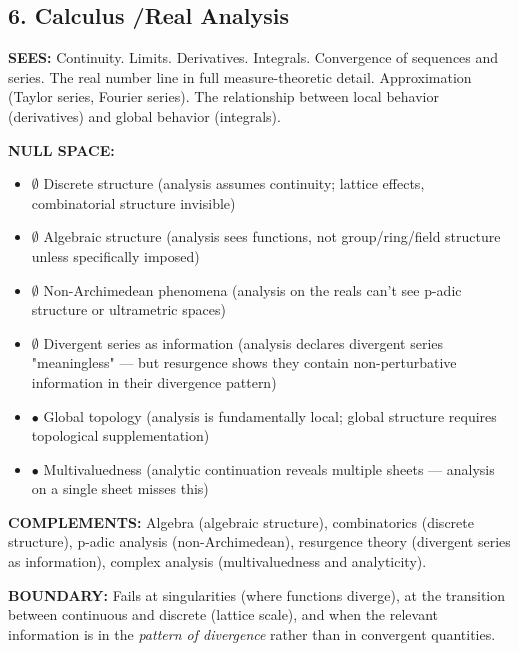 \bigskip\noindent\makebox[\textwidth]{\color{rulegray}\rule{5cm}{0.3pt}}\bigskip


\subsection*{6. Calculus /\allowbreak  Real Analysis}


\textbf{SEES:} Continuity. Limits. Derivatives. Integrals. Convergence of sequences and series. The real number line in full measure-theoretic detail. Approximation (Taylor series, Fourier series). The relationship between local behavior (derivatives) and global behavior (integrals).


\textbf{NULL SPACE:}

\begin{itemize}[nosep,leftmargin=*]
  \item $\emptyset$ Discrete structure (analysis assumes continuity; lattice effects, combinatorial structure invisible)
  \item $\emptyset$ Algebraic structure (analysis sees functions, not group/\allowbreak ring/\allowbreak field structure unless specifically imposed)
  \item $\emptyset$ Non-Archimedean phenomena (analysis on the reals can't see p-adic structure or ultrametric spaces)
  \item $\emptyset$ Divergent series as information (analysis declares divergent series "meaningless" — but resurgence shows they contain non-perturbative information in their divergence pattern)
  \item $\bullet$ Global topology (analysis is fundamentally local; global structure requires topological supplementation)
  \item $\bullet$ Multivaluedness (analytic continuation reveals multiple sheets — analysis on a single sheet misses this)
\end{itemize}


\textbf{COMPLEMENTS:} Algebra (algebraic structure), combinatorics (discrete structure), p-adic analysis (non-Archimedean), resurgence theory (divergent series as information), complex analysis (multivaluedness and analyticity).


\textbf{BOUNDARY:} Fails at singularities (where functions diverge), at the transition between continuous and discrete (lattice scale), and when the relevant information is in the \textit{pattern of divergence} rather than in convergent quantities.



